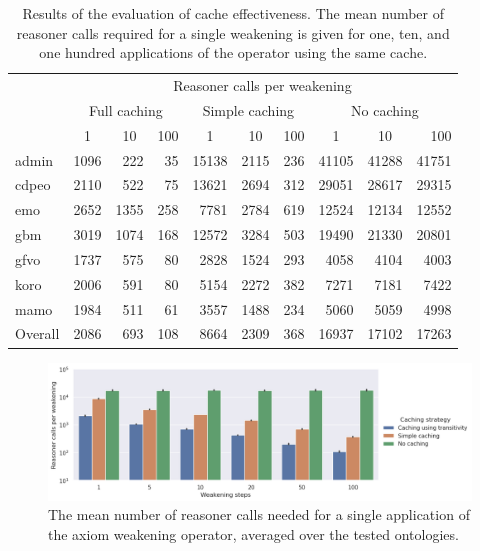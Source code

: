\begin{table}[ht]
  \scriptsize
  \centering
  \begin{tabular}{|l|rrr|rrr|rrr|}
    \cline{2-10}
    \multicolumn{1}{l|}{} & \multicolumn{9}{c|}{\hspace{-4mm}Reasoner calls per weakening} \\
    \multicolumn{1}{l|}{} & \multicolumn{3}{c}{Full caching} & \multicolumn{3}{c}{Simple caching} & \multicolumn{3}{c|}{No caching} \\
    \multicolumn{1}{l|}{} & \multicolumn{1}{c}{1} & \multicolumn{1}{c}{10} & \multicolumn{1}{c}{100} & \multicolumn{1}{c}{1} & \multicolumn{1}{c}{10} & \multicolumn{1}{c}{100} & \multicolumn{1}{c}{1} & \multicolumn{1}{c}{10} & 100 \\
    \hline
    admin & 1096 & 222 & 35
      & 15138 & 2115 & 236
      & 41105 & 41288 & 41751 \\
    cdpeo & 2110 & 522 & 75
      & 13621 & 2694 & 312
      & 29051 & 28617 & 29315 \\
    emo & 2652 & 1355 & 258
      & 7781 & 2784 & 619
      & 12524 & 12134 & 12552 \\
    gbm & 3019 & 1074 & 168
      & 12572 & 3284 & 503
      & 19490 & 21330 & 20801 \\
    gfvo & 1737 & 575 & 80
      & 2828 & 1524 & 293
      & 4058 & 4104 & 4003 \\
    koro & 2006 & 591 & 80
      & 5154 & 2272 & 382
      & 7271 & 7181 & 7422 \\
    mamo &  1984 & 511 & 61
      & 3557 & 1488 & 234
      & 5060 & 5059 & 4998 \\
    \hline
    Overall & 2086 & 693 & 108
      & 8664 & 2309 & 368
      & 16937 & 17102 & 17263 \\
    \hline
  \end{tabular}
  \caption{Results of the evaluation of cache effectiveness. The mean number of reasoner calls required for a single weakening is given for one, ten, and one hundred applications of the operator using the same cache.}
  \label{table:results-cache-calls}
\end{table}

\begin{figure}[ht]
  \centering
  \includegraphics[width=\textwidth]{resources/calls-cache-bar.png}
  \caption{The mean number of reasoner calls needed for a single application of the axiom weakening operator, averaged over the tested ontologies.}
  \label{fig:results-cache-calls}
\end{figure}

